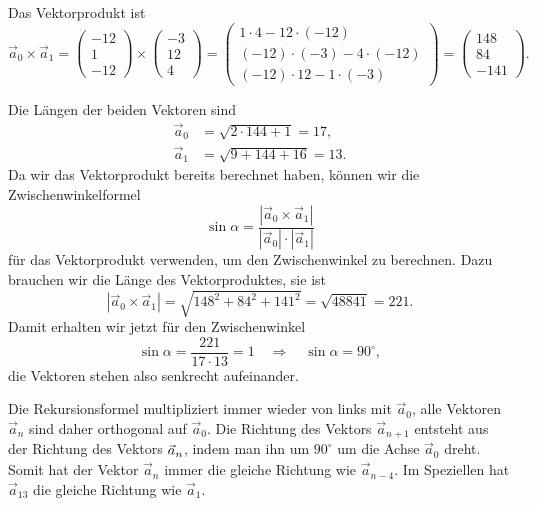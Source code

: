 \begin{loesung}
\begin{teilaufgaben}
\item
Das Vektorprodukt ist
\[
\vec{a}_0\times\vec{a}_1
=
\begin{pmatrix}
  -12\\
    1\\
  -12
\end{pmatrix}
\times
\begin{pmatrix}
   -3\\
   12\\
    4
\end{pmatrix}
=
\begin{pmatrix}
1\cdot 4-12\cdot(-12)\\
(-12)\cdot(-3)-4\cdot(-12)\\
(-12)\cdot12-1\cdot(-3)
\end{pmatrix}
=
\begin{pmatrix}
148\\84\\-141
\end{pmatrix}.
\]
\item Die Längen der beiden Vektoren sind
\begin{align*}
\vec{a}_0
&=
\sqrt{2\cdot 144+1}
=
17,
\\
\vec{a}_1
&=
\sqrt{9+144+16} = 13.
\end{align*}
Da wir das Vektorprodukt bereits berechnet haben, können wir die
Zwischenwinkelformel
\[
\sin\alpha = \frac{|\vec{a}_0\times\vec{a}_1|}{|\vec{a}_0|\cdot|\vec{a}_1|}
\]
für das Vektorprodukt verwenden, um den Zwischenwinkel zu berechnen.
Dazu brauchen wir die Länge des Vektorproduktes, sie ist
\[
|\vec{a}_0\times\vec{a}_1|
=
\sqrt{148^2 + 84^2 + 141^2}
=
\sqrt{48841} = 221.
\]
Damit erhalten wir jetzt für den Zwischenwinkel
\[
\sin\alpha = \frac{221}{17\cdot 13} = 1
\quad\Rightarrow\quad
\sin\alpha=90^\circ,
\]
die Vektoren stehen also senkrecht aufeinander.
\item
Die Rekursionsformel multipliziert immer wieder von links mit $\vec{a}_0$,
alle Vektoren $\vec{a}_n$ sind daher orthogonal auf $\vec{a}_0$.
Die Richtung des Vektors $\vec{a}_{n+1}$ entsteht aus der Richtung
des Vektors $\vec{a}_{n\mathstrut}$, indem man ihn um $90^\circ$ um die
Achse $\vec{a}_0$ dreht.
Somit hat der Vektor $\vec{a}_n$ immer die gleiche Richtung wie
$\vec{a}_{n-4}$.
Im Speziellen hat $\vec{a}_{13}$ die gleiche Richtung wie $\vec{a}_1$.


\end{teilaufgaben}
\end{loesung}
